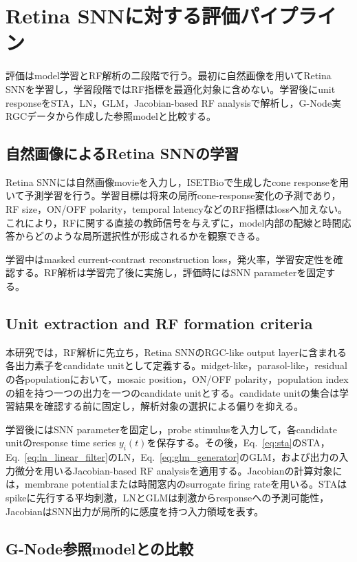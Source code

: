 \documentclass[uplatex,dvipdfmx,a4paper,10pt]{jsarticle}
\begin{document}
\section{Retina SNNに対する評価パイプライン}
\label{sec:evaluation_pipeline}

評価はmodel学習とRF解析の二段階で行う。最初に自然画像を用いてRetina SNNを学習し，学習段階ではRF指標を最適化対象に含めない。学習後にunit responseをSTA，LN，GLM，Jacobian-based RF analysisで解析し，G-Node実RGCデータから作成した参照modelと比較する。

\subsection{自然画像によるRetina SNNの学習}
\label{subsec:alignment}

Retina SNNには自然画像movieを入力し，ISETBioで生成したcone responseを用いて予測学習を行う。学習目標は将来の局所cone-response変化の予測であり，RF size，ON/OFF polarity，temporal latencyなどのRF指標はlossへ加えない。これにより，RFに関する直接の教師信号を与えずに，model内部の配線と時間応答からどのような局所選択性が形成されるかを観察できる。

学習中はmasked current-contrast reconstruction loss，発火率，学習安定性を確認する。RF解析は学習完了後に実施し，評価時にはSNN parameterを固定する。

\subsection{Unit extraction and RF formation criteria}
\label{subsec:unit_extraction}

本研究では，RF解析に先立ち，Retina SNNのRGC-like output layerに含まれる各出力素子をcandidate unitとして定義する。midget-like，parasol-like，residualの各populationにおいて，mosaic position，ON/OFF polarity，population indexの組を持つ一つの出力を一つのcandidate unitとする。candidate unitの集合は学習結果を確認する前に固定し，解析対象の選択による偏りを抑える。

学習後にはSNN parameterを固定し，probe stimulusを入力して，各candidate unitのresponse time series \(y_i(t)\)を保存する。その後，Eq.~\eqref{eq:sta}のSTA，Eq.~\eqref{eq:ln_linear_filter}のLN，Eq.~\eqref{eq:glm_generator}のGLM，および出力の入力微分を用いるJacobian-based RF analysisを適用する。Jacobianの計算対象には，membrane potentialまたは時間窓内のsurrogate firing rateを用いる。STAはspikeに先行する平均刺激，LNとGLMは刺激からresponseへの予測可能性，JacobianはSNN出力が局所的に感度を持つ入力領域を表す。
\subsection{G-Node参照modelとの比較}
\label{subsec:population_comparison}
\end{document}
